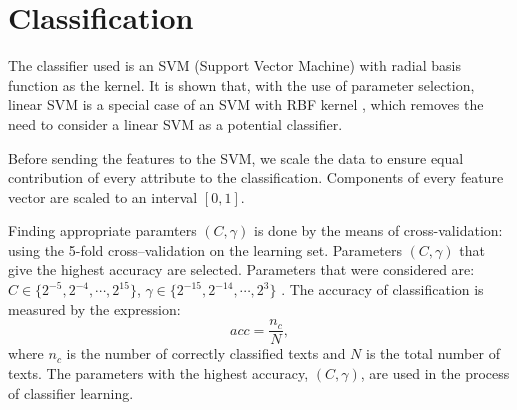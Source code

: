 \documentclass{llncs}
\begin{document}
\section{Classification}
The classifier used is an SVM (Support Vector Machine) with radial basis
function as the kernel. It is shown that, with the use of parameter selection,
linear SVM is a special case of an SVM with RBF kernel \cite{keerthi2003asymptotic},
which removes the need to consider a linear SVM as a potential classifier.

Before sending the features to the SVM, we scale the data to ensure
equal contribution of every attribute to the classification. Components of
every feature vector are scaled to an interval $[0, 1]$.

Finding appropriate paramters $(C, \gamma)$ is done by the means of
cross-validation: using the 5-fold cross--validation on the
learning set. Parameters $(C, \gamma)$ that give the highest accuracy are
selected. Parameters that were considered are: $C \in \{2^{-5}, 2^{-4}, \cdots ,
2^{15}\}$, $\gamma \in \{2^{-15}, 2^{-14}, \cdots, 2^3\}$ \cite{CC01a}.
The accuracy of classification is measured by the expression:
\begin{equation}
acc = \frac{n_c}{N}, %
\end{equation}
where $n_c$ is the number of correctly classified texts and $N$ is the total number of
texts. The parameters with the highest accuracy, $(C, \gamma)$, 
are used in the process of classifier learning.
\end{document}

